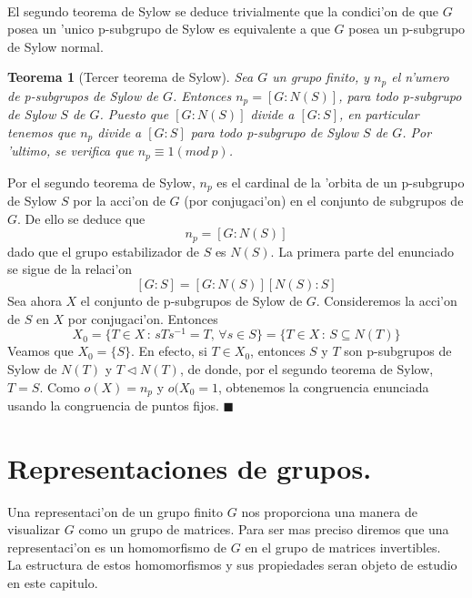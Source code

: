 \documentclass[a4paper,openright,12pt]{book}
\numberwithin{equation}{section} %
\newtheorem{teorema}{Teorema}[section] %
\newenvironment{proof}{\noindent{\it Demostracion:}}{\hfill$\blacksquare$} %
\begin{document}
\\
El segundo teorema de Sylow se deduce trivialmente que la condici'on de que $G$ posea un 'unico p-subgrupo de Sylow es equivalente a que $G$ posea un p-subgrupo de Sylow normal.
\begin{teorema}[Tercer teorema de Sylow]
Sea $G$ un grupo finito, y $n_{p}$ el n'umero de p-subgrupos de Sylow de $G$. Entonces $n_{p}=[G:N(S)]$, para todo p-subgrupo de Sylow $S$ de $G$. Puesto que $[G:N(S)]$ divide a $[G:S]$, en particular tenemos que $n_{p}$ divide a $[G:S]$ para todo p-subgrupo de Sylow $S$ de $G$. Por 'ultimo, se verifica que $n_{p} \equiv 1(mod \, p)$.
\end{teorema}
\begin{proof}
Por el segundo teorema de Sylow, $n_{p}$ es el cardinal de la 'orbita de un p-subgrupo de Sylow $S$ por la acci'on de $G$ (por conjugaci'on) en el conjunto de subgrupos de $G$. De ello se deduce que
\[
n_{p}=[G:N(S)]
\]
dado que el grupo estabilizador de $S$ es $N(S)$. La primera parte del enunciado se sigue de la relaci'on
\[
[G:S]=[G:N(S)][N(S):S]
\]
Sea ahora $X$ el conjunto de p-subgrupos de Sylow de $G$. Consideremos la acci'on de $S$ en $X$ por conjugaci'on. Entonces
\[
X_{0}=\{ T \in X \, : \, sTs^{-1}=T, \, \forall s \in S \} = \{T \in X \, : \, S \subseteq N(T) \}
\]
Veamos que $X_{0}=\{ S \}$. En efecto, si $T \in X_{0}$, entonces $S$ y $T$ son p-subgrupos de Sylow de $N(T)$ y $T \triangleleft N(T)$, de donde, por el segundo teorema de Sylow, $T=S$. Como $o(X)=n_{p}$ y $o(X_{0}=1$, obtenemos la congruencia enunciada usando la congruencia de puntos fijos.
\end{proof}
\chapter{Representaciones de grupos.}
Una representaci'on de un grupo finito $G$ nos proporciona una manera de visualizar $G$ como un grupo de matrices. Para ser mas preciso diremos que una representaci'on es un homomorfismo de $G$ en el grupo de matrices invertibles.\\
La estructura de estos homomorfismos y sus propiedades seran objeto de estudio en este capitulo.   
\end{document}
